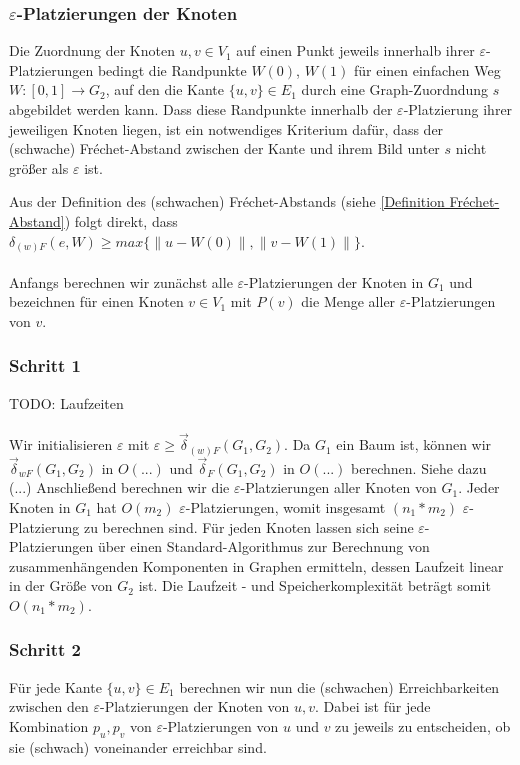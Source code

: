 \documentclass[a4paper, 12pt, twoside]{article}
\theoremstyle{Format1} %
\begin{document}
\subsubsection{$\varepsilon$-Platzierungen der Knoten} \label{Platzierungen der Knoten}
Die Zuordnung der Knoten $u,v \in V_1$ auf einen Punkt jeweils innerhalb ihrer $\varepsilon$-Platzierungen bedingt die Randpunkte $W(0)$, $W(1)$
für einen einfachen Weg $W: [0,1] \to G_2$, auf den die Kante $\{u,v\} \in E_1$ durch eine Graph-Zuordndung $s$ abgebildet werden kann.
Dass diese Randpunkte innerhalb der $\varepsilon$-Platzierung ihrer jeweiligen Knoten liegen, ist ein notwendiges Kriterium dafür, dass der (schwache) Fréchet-Abstand
zwischen der Kante und ihrem Bild unter $s$ nicht größer als $\varepsilon$ ist.

Aus der Definition des (schwachen) Fréchet-Abstands (siehe \ref{Definition Fréchet-Abstand}) folgt direkt, dass
$\delta_{(w)F}(e, W) \geq max{\{\|u-W(0)\|, \|v-W(1)\|\}}$.
\\
\\
Anfangs berechnen wir zunächst alle $\varepsilon$-Platzierungen der Knoten in $G_1$ und bezeichnen für einen Knoten $v \in V_1$ mit $P(v)$ die Menge
aller $\varepsilon$-Platzierungen von $v$.

\subsubsection{Schritt 1} \label{Schritt 1}
TODO: Laufzeiten
\\
\\
Wir initialisieren $\varepsilon$ mit $\varepsilon \geq \vec{\delta}_{(w)F}(G_1, G_2)$.
Da $G_1$ ein Baum ist, können wir
$\vec{\delta}_{wF}(G_1, G_2)$ in $O(...)$ und $\vec{\delta}_F(G_1, G_2)$ in $O(...)$ berechnen. Siehe dazu (...)
Anschließend berechnen wir die $\varepsilon$-Platzierungen aller Knoten von $G_1$. Jeder Knoten in $G_1$ hat $O(m_2)$
$\varepsilon$-Platzierungen, womit insgesamt $(n_1*m_2)$ $\varepsilon$-Platzierung zu berechnen sind.
Für jeden Knoten lassen sich seine $\varepsilon$-Platzierungen über einen Standard-Algorithmus zur Berechnung von
zusammenhängenden Komponenten in Graphen ermitteln, dessen Laufzeit linear in der Größe von $G_2$ ist.
Die Laufzeit - und Speicherkomplexität beträgt somit $O(n_1*m_2)$.

\subsubsection{Schritt 2} \label{Schritt 2}
Für jede Kante $\{u, v\} \in E_1$ berechnen wir nun die (schwachen) Erreichbarkeiten zwischen den $\varepsilon$-Platzierungen der Knoten von $u,v$.
Dabei ist für jede Kombination $p_u, p_v$ von $\varepsilon$-Platzierungen von $u$ und $v$ zu jeweils zu entscheiden, ob sie (schwach) voneinander erreichbar sind.
\end{document}
